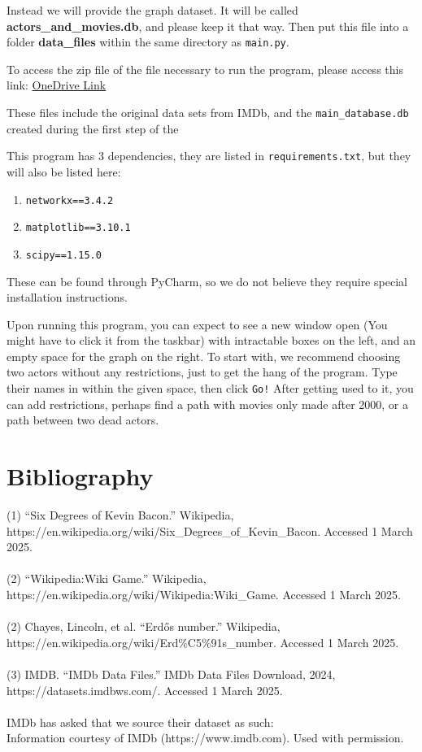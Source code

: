 \documentclass{article}
\begin{document}
Instead we will provide the graph dataset. It will be called \textbf{actors\_and\_movies.db}, and please keep it that way. Then put this file into a folder \textbf{data\_files} within the same directory as \verb!main.py!.

To access the zip file of the file necessary to run the program, please access this link: \href{https://utoronto-my.sharepoint.com/:u:/g/personal/nabhan_rashid_mail_utoronto_ca/EYMbuqB8-ARIrHxDK7YhbWkBS4cH6Imba-6myQPnr1z57w?e=JQY8F9}{OneDrive Link}

These files include the original data sets from IMDb, and the \verb!main_database.db! created during the first step of the 

This program has 3 dependencies, they are listed in \verb!requirements.txt!, but they will also be listed here:
\begin{enumerate}
\item \verb!networkx==3.4.2!
\item \verb!matplotlib==3.10.1!
\item \verb!scipy==1.15.0!
\end{enumerate}
These can be found through PyCharm, so we do not believe they require special installation instructions.

Upon running this program, you can expect to see a new window open (You might have to click it from the taskbar) with intractable boxes on the left, and an empty space for the graph on the right. To start with, we recommend choosing two actors without any restrictions, just to get the hang of the program. Type their names in within the given space, then click \verb+Go!+ After getting used to it, you can add restrictions, perhaps find a path with movies only made after 2000, or a path between two dead actors.

\section{Bibliography}

(1) “Six Degrees of Kevin Bacon.” Wikipedia, https://en.wikipedia.org/wiki/Six\_Degrees\_of\_Kevin\_Bacon. Accessed 1 March 2025.\\\\

(2) “Wikipedia:Wiki Game.” Wikipedia, https://en.wikipedia.org/wiki/Wikipedia:Wiki\_Game. Accessed 1 March 2025.\\\\

(2) Chayes, Lincoln, et al. “Erdős number.” Wikipedia, https://en.wikipedia.org/wiki/Erd\%C5\%91s\_number. Accessed 1 March 2025.\\\\

(3) IMDB. “IMDb Data Files.” IMDb Data Files Download, 2024, https://datasets.imdbws.com/. Accessed 1 March 2025.\\\\



IMDb has asked that we source their dataset as such:\\
Information courtesy of
IMDb
(https://www.imdb.com).
Used with permission.
\end{document}
